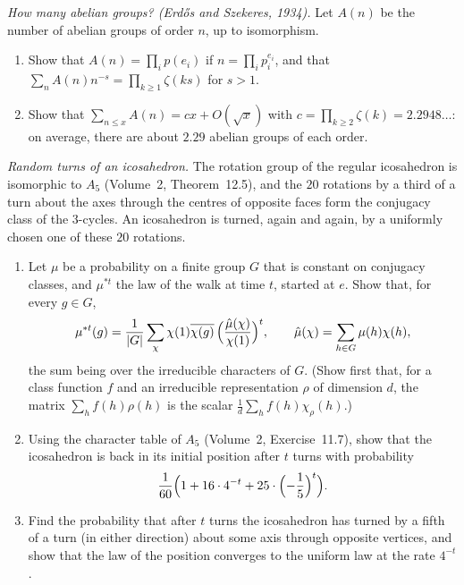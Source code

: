 \begin{exercise}[$\star\star$]\label{pb:abelian}
\emph{How many abelian groups? (Erdős and Szekeres, 1934).} Let $A(n)$ be the number of abelian groups of order $n$, up to
isomorphism.
\begin{enumerate}[label=(\alph*)]
\item Show that $A(n)=\prod_ip(e_i)$ if $n=\prod_ip_i^{e_i}$, and that $\sum_nA(n)n^{-s}=\prod_{k\ge1}\zeta(ks)$ for $s>1$.
\item Show that $\sum_{n\le x}A(n)=cx+O(\sqrt x)$ with $c=\prod_{k\ge2}\zeta(k)=2.2948\ldots$: on average, there are about $2.29$
abelian groups of each order.
\end{enumerate}
\end{exercise}

\begin{exercise}[$\star\star\star$]\label{pb:dodecaturns}
\emph{Random turns of an icosahedron.} The rotation group of the regular icosahedron is isomorphic to $A_5$ (Volume~2, Theorem~12.5), and the
$20$ rotations by a third of a turn about the axes through the centres of opposite faces form the conjugacy class of the
$3$-cycles. An icosahedron is turned, again and again, by a uniformly chosen one of these $20$ rotations.
\begin{enumerate}[label=(\alph*)]
\item Let $\mu$ be a probability on a finite group $G$ that is constant on conjugacy classes, and $\mu^{*t}$ the law of the walk at time
$t$, started at $e$. Show that, for every $g\in G$,
\[
\mu^{*t}(g)=\frac1{|G|}\sum_\chi\chi(1)\overline{\chi(g)}\,\Bigl(\frac{\hat\mu(\chi)}{\chi(1)}\Bigr)^t,\qquad\hat\mu(\chi)=\sum_{h\in G}\mu(h)\chi(h),
\]
the sum being over the irreducible characters of $G$. (Show first that, for a class function $f$ and an irreducible representation $\rho$ of
dimension $d$, the matrix $\sum_hf(h)\rho(h)$ is the scalar $\frac1d\sum_hf(h)\chi_\rho(h)$.)
\item Using the character table of $A_5$ (Volume~2, Exercise~11.7), show that the icosahedron is back in its initial position after $t$
turns with probability
\[
\frac1{60}\Bigl(1+16\cdot4^{-t}+25\cdot\Bigl(-\frac15\Bigr)^t\Bigr).
\]
\item Find the probability that after $t$ turns the icosahedron has turned by a fifth of a turn (in either direction) about some
axis through opposite vertices, and show that the law of the position converges to the uniform law at the rate $4^{-t}$.
\end{enumerate}
\end{exercise}

